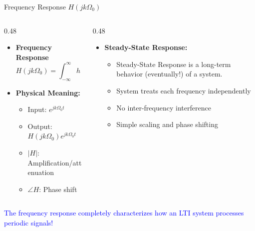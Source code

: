\documentclass[aspectratio=169,xcolor=dvipsnames,svgnames,x11names,fleqn]{beamer}
\begin{document}
\begin{frame}{Frequency Response $H(jk\Omega_0)$}
\small

\begin{columns}[T]
\begin{column}{0.48\textwidth}
\begin{itemize}
    \item \textbf{Frequency Response}
    $$H(jk\Omega_0) = \int_{-\infty}^{\infty} h(\tau)e^{-jk\Omega_0\tau}d\tau$$
    
    \item \textbf{Physical Meaning:}
    \begin{itemize}
        \item Input: $e^{jk\Omega_0 t}$
        \item Output: $H(jk\Omega_0)e^{jk\Omega_0 t}$
        \item $|H|$: Amplification/attenuation
        \item $\angle H$: Phase shift
    \end{itemize}
\end{itemize}
\end{column}

\begin{column}{0.48\textwidth}
\begin{itemize}
    
    \item \textbf{Steady-State Response:}
    \begin{itemize}
        \item Steady-State Response is a long-term behavior (eventually!) of a system.
        \item System treats each frequency independently
        \item No inter-frequency interference
        \item Simple scaling and phase shifting
    \end{itemize}
\end{itemize}
\end{column}
\end{columns}

\vspace{0.3cm}
\textcolor{blue}{The frequency response completely characterizes how an LTI system processes periodic signals!}

\end{frame}
\end{document}
